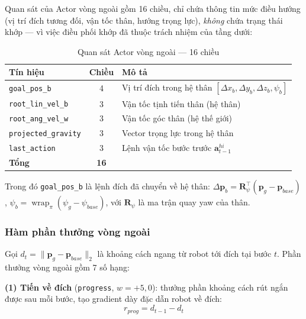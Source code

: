 Quan sát của Actor vòng ngoài gồm 16 chiều, chỉ chứa thông tin mức điều
hướng (vị trí đích tương đối, vận tốc thân, hướng trọng lực), \emph{không}
chứa trạng thái khớp — vì việc điều phối khớp đã thuộc trách nhiệm của tầng
dưới:

\begin{table}[H]
    \centering
    \caption{Quan sát Actor vòng ngoài — 16 chiều}
    \label{tab:nav_obs}
    \renewcommand{\arraystretch}{1.3}
    \begin{tabular}{|l|c|l|}
    \hline
    \textbf{Tín hiệu} & \textbf{Chiều} & \textbf{Mô tả} \\
    \hline
    \texttt{goal\_pos\_b}        & 4 & Vị trí đích trong hệ thân $[\Delta x_b,\Delta y_b,\Delta z_b,\psi_b]$ \\
    \texttt{root\_lin\_vel\_b}   & 3 & Vận tốc tịnh tiến thân (hệ thân) \\
    \texttt{root\_ang\_vel\_w}   & 3 & Vận tốc góc thân (hệ thế giới) \\
    \texttt{projected\_gravity}  & 3 & Vector trọng lực trong hệ thân \\
    \texttt{last\_action}        & 3 & Lệnh vận tốc bước trước $\mathbf{a}^{hi}_{t-1}$ \\
    \hline
    \textbf{Tổng} & \textbf{16} & \\
    \hline
    \end{tabular}
\end{table}

Trong đó \texttt{goal\_pos\_b} là lệnh đích đã chuyển về hệ thân:
$\Delta\mathbf{p}_b = \mathbf{R}_{\psi}^{\!\top}(\mathbf{p}_g-\mathbf{p}_{base})$,
$\psi_b = \operatorname{wrap}_\pi(\psi_g - \psi_{base})$, với $\mathbf{R}_\psi$
là ma trận quay yaw của thân.

\subsubsection{Hàm phần thưởng vòng ngoài}

Gọi $d_t = \lVert \mathbf{p}_{g} - \mathbf{p}_{base}\rVert_2$ là khoảng cách
ngang từ robot tới đích tại bước $t$. Phần thưởng vòng ngoài gồm 7 số hạng:

\textbf{(1) Tiến về đích} (\texttt{progress}, $w=+5{,}0$): thưởng phần
khoảng cách rút ngắn được sau mỗi bước, tạo gradient dày đặc dẫn robot
về đích:
\begin{equation}
    r_{prog} = d_{t-1} - d_t
    \label{eq:nav_progress}
\end{equation}

